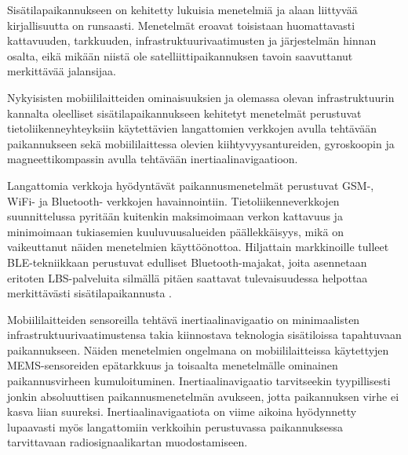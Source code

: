 \documentclass[a4paper,parskip=half]{scrartcl}
\begin{document}
Sisätilapaikannukseen on kehitetty lukuisia menetelmiä ja alaan liittyvää
kirjallisuutta on runsaasti. Menetelmät eroavat toisistaan huomattavasti
kattavuuden, tarkkuuden, infrastruktuurivaatimusten ja järjestelmän hinnan
osalta, eikä mikään niistä ole satelliittipaikannuksen tavoin saavuttanut
merkittävää jalansijaa.

Nykyisisten mobiililaitteiden ominaisuuksien ja olemassa olevan infrastruktuurin
kannalta oleelliset sisätilapaikannukseen kehitetyt menetelmät perustuvat
tietoliikenneyhteyksiin käytettävien langattomien verkkojen avulla tehtävään
paikannukseen sekä mobiililaittessa olevien
kiihtyvyysantureiden, gyroskoopin ja magneettikompassin avulla tehtävään
inertiaalinavigaatioon.

Langattomia verkkoja hyödyntävät paikannusmenetelmät perustuvat GSM-, WiFi-
ja Bluetooth- verkkojen havainnointiin. Tietoliikenneverkkojen suunnittelussa 
pyritään kuitenkin maksimoimaan verkon kattavuus
ja minimoimaan tukiasemien kuuluvuusalueiden päällekkäisyys, mikä on
vaikeuttanut näiden menetelmien käyttöönottoa. Hiljattain markkinoille tulleet
\acrshort{BLE}-tekniikkaan perustuvat edulliset Bluetooth-majakat, joita
asennetaan eritoten \acrshort{LBS}-palveluita silmällä pitäen saattavat
tulevaisuudessa helpottaa merkittävästi sisätilapaikannusta
\cite{sand2014positioning}.

Mobiililaitteiden sensoreilla tehtävä inertiaalinavigaatio on minimaalisten
infrastruktuurivaatimustensa takia kiinnostava teknologia sisätiloissa
tapahtuvaan paikannukseen. Näiden menetelmien ongelmana on mobiililaitteissa
käytettyjen \acrshort{MEMS}-sen\-so\-rei\-den e\-pä\-tark\-kuus ja toisaalta menetelmälle
ominainen paikannusvirheen kumuloituminen. Inertiaalinavigaatio tarvitseekin
tyypillisesti jonkin absoluuttisen paikannusmenetelmän avukseen, jotta
paikannuksen virhe ei kasva liian suureksi. Inertiaalinavigaatiota on
viime aikoina hyödynnetty lupaavasti myös langattomiin verkkoihin perustuvassa
paikannuksessa tarvittavaan radiosignaalikartan muodostamiseen.

\printglossary[type=\acronymtype,title=Lyhenteet]



\end{document}
